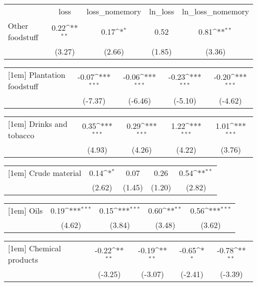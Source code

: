 {
\def\sym#1{\ifmmode^{#1}\else\(^{#1}\)\fi}
\begin{tabular}{l*{4}{c}}
                &\multicolumn{1}{c}{loss}&\multicolumn{1}{c}{loss\_nomemory}&\multicolumn{1}{c}{ln\_loss}&\multicolumn{1}{c}{ln\_loss\_nomemory}\\
[1em]
Other foodstuff &     0.22\sym{**} &     0.17\sym{*}  &     0.52         &     0.81\sym{**} \\
                &   (3.27)         &   (2.66)         &   (1.85)         &   (3.36)         \\
\end{tabular}
}
{
\def\sym#1{\ifmmode^{#1}\else\(^{#1}\)\fi}
\begin{tabular}{l*{4}{c}}
[1em]
Plantation foodstuff&    -0.07\sym{***}&    -0.06\sym{***}&    -0.23\sym{***}&    -0.20\sym{***}\\
                &  (-7.37)         &  (-6.46)         &  (-5.10)         &  (-4.62)         \\
\end{tabular}
}
{
\def\sym#1{\ifmmode^{#1}\else\(^{#1}\)\fi}
\begin{tabular}{l*{4}{c}}
[1em]
Drinks and tobacco&     0.35\sym{***}&     0.29\sym{***}&     1.22\sym{***}&     1.01\sym{***}\\
                &   (4.93)         &   (4.26)         &   (4.22)         &   (3.76)         \\
\end{tabular}
}
{
\def\sym#1{\ifmmode^{#1}\else\(^{#1}\)\fi}
\begin{tabular}{l*{4}{c}}
[1em]
Crude material  &     0.14\sym{*}  &     0.07         &     0.26         &     0.54\sym{**} \\
                &   (2.62)         &   (1.45)         &   (1.20)         &   (2.82)         \\
\end{tabular}
}
{
\def\sym#1{\ifmmode^{#1}\else\(^{#1}\)\fi}
\begin{tabular}{l*{4}{c}}
[1em]
Oils            &     0.19\sym{***}&     0.15\sym{***}&     0.60\sym{**} &     0.56\sym{***}\\
                &   (4.62)         &   (3.84)         &   (3.48)         &   (3.62)         \\
\end{tabular}
}
{
\def\sym#1{\ifmmode^{#1}\else\(^{#1}\)\fi}
\begin{tabular}{l*{4}{c}}
[1em]
Chemical products&    -0.22\sym{**} &    -0.19\sym{**} &    -0.65\sym{*}  &    -0.78\sym{**} \\
                &  (-3.25)         &  (-3.07)         &  (-2.41)         &  (-3.39)         \\
\end{tabular}
}
